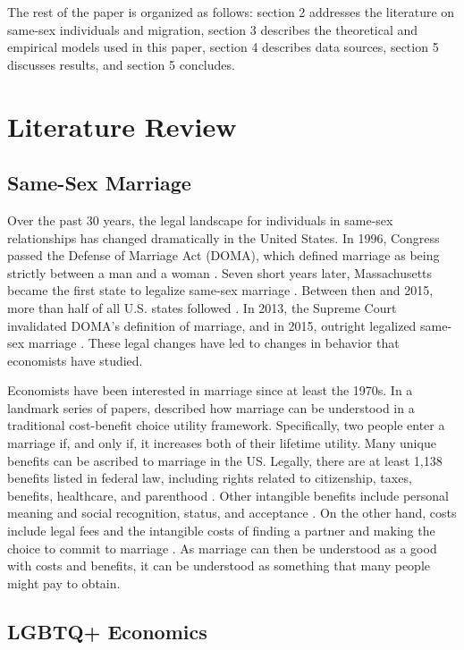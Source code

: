 \documentclass[12pt,letterpaper]{article}
\begin{document}
The rest of the paper is organized as follows: section 2 addresses the literature on same-sex individuals and migration, section 3 describes the theoretical and empirical models used in this paper, section 4 describes data sources, section 5 discusses results, and section 5 concludes.

\section{Literature Review}
\subsection{Same-Sex Marriage}
Over the past 30 years, the legal landscape for individuals in same-sex relationships has changed dramatically in the United States. In 1996, Congress passed the Defense of Marriage Act (DOMA), which defined marriage as being strictly between a man and a woman \citep{5}. Seven short years later, Massachusetts became the first state to legalize same-sex marriage \citep{1, 3, 5}. Between then and 2015, more than half of all U.S. states followed \citep{12}. In 2013, the Supreme Court invalidated DOMA’s definition of marriage, and in 2015, outright legalized same-sex marriage \citep{1, 3, 5, 12}. These legal changes have led to changes in behavior that economists have studied.

Economists have been interested in marriage since at least the 1970s. In a landmark series of papers, \citet{9} described how marriage can be understood in a traditional cost-benefit choice utility framework. Specifically, two people enter a marriage if, and only if, it increases both of their lifetime utility. Many unique benefits can be ascribed to marriage in the US. Legally, there are at least 1,138 benefits listed in federal law, including rights related to citizenship, taxes, benefits, healthcare, and parenthood \citep{1, 8}. Other intangible benefits include personal meaning and social recognition, status, and acceptance \citep{8}. On the other hand, costs include legal fees and the intangible costs of finding a partner and making the choice to commit to marriage \citep{9}. As marriage can then be understood as a good with costs and benefits, it can be understood as something that many people might pay to obtain. 

\subsection{LGBTQ+ Economics}
\end{document}
